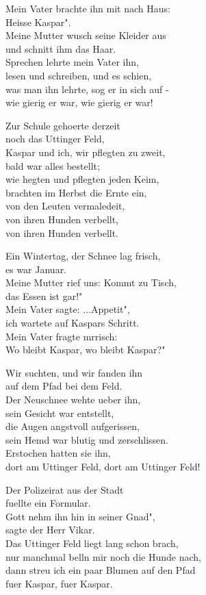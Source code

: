 \documentclass[
  letterpaper,
  twoside=false]{scrbook}
\begin{document}
Mein Vater brachte ihn mit nach Haus:\\
Heisse Kaspar".\\
Meine Mutter wusch seine Kleider aus\\
und schnitt ihm das Haar.\\
Sprechen lehrte mein Vater ihn,\\
lesen und schreiben, und es schien,\\
was man ihn lehrte, sog er in sich auf -\\
wie gierig er war, wie gierig er war!

Zur Schule gehoerte derzeit\\
noch das Uttinger Feld,\\
Kaspar und ich, wir pflegten zu zweit,\\
bald war alles bestellt;\\
wie hegten und pflegten jeden Keim,\\
brachten im Herbst die Ernte ein,\\
von den Leuten vermaledeit,\\
von ihren Hunden verbellt,\\
von ihren Hunden verbellt.

Ein Wintertag, der Schnee lag frisch,\\
es war Januar.\\
Meine Mutter rief uns: Kommt zu Tisch,\\
das Essen ist gar!"\\
Mein Vater sagte: ...Appetit",\\
ich wartete auf Kaspars Schritt.\\
Mein Vater fragte mrrisch:\\
Wo bleibt Kaspar, wo bleibt Kaspar?"

Wir suchten, und wir fanden ihn\\
auf dem Pfad bei dem Feld.\\
Der Neuschnee wehte ueber ihn,\\
sein Gesicht war entstellt,\\
die Augen angstvoll aufgerissen,\\
sein Hemd war blutig und zerschlissen.\\
Erstochen hatten sie ihn,\\
dort am Uttinger Feld, dort am Uttinger Feld!

Der Polizeirat aus der Stadt\\
fuellte ein Formular.\\
Gott nehm\textquotesingle{} ihn hin in seiner Gnad"\textquotesingle,\\
sagte der Herr Vikar.\\
Das Uttinger Feld liegt lang schon brach,\\
nur manchmal bell\textquotesingle n mir noch die Hunde nach,\\
dann streu\textquotesingle{} ich ein paar Blumen auf den Pfad\\
fuer Kaspar, fuer Kaspar.
\end{document}
